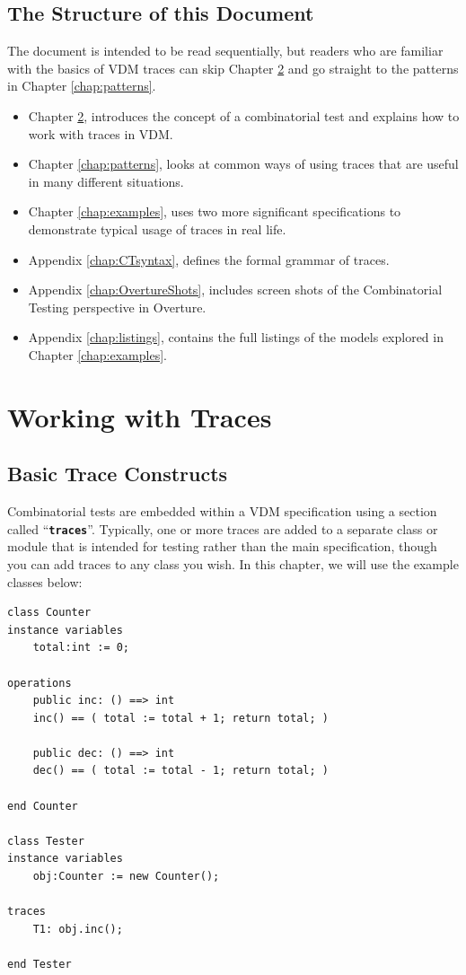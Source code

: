 \documentclass{overturerepchap}
\begin{document}
\section{The Structure of this Document}

The document is intended to be read sequentially, but readers who are familiar
with the basics of VDM traces can skip Chapter \ref{chap:traces} and go straight
to the patterns in Chapter \ref{chap:patterns}.

\begin{itemize}
\item Chapter \ref{chap:traces},  introduces the concept of
a combinatorial test and explains how to work with traces in VDM.
\item Chapter \ref{chap:patterns},  looks at common ways
of using traces that are useful in many different situations.
\item Chapter \ref{chap:examples},  uses two more
significant specifications to demonstrate typical usage of traces in real life.
\item Appendix \ref{chap:CTsyntax},  defines the formal
grammar of traces.
\item Appendix \ref{chap:OvertureShots},  includes
screen shots of the Combinatorial Testing perspective in Overture.
\item Appendix \ref{chap:listings},  contains the full
listings of the models explored in Chapter \ref{chap:examples}.
\end{itemize}

\chapter{Working with Traces}
\label{chap:traces}

\section{Basic Trace Constructs}
Combinatorial tests are embedded within a VDM specification using a section
called ``\texttt{\textbf{traces}}''. Typically, one or more traces are added to a separate class
or module that is intended for testing rather than the main specification,
though you can add traces to any class you wish. In this chapter, we will use
the example classes below:

\small
\begin{lstlisting}
class Counter
instance variables
    total:int := 0;

operations
    public inc: () ==> int
    inc() == ( total := total + 1; return total; )

    public dec: () ==> int
    dec() == ( total := total - 1; return total; )

end Counter

class Tester
instance variables
    obj:Counter := new Counter();

traces
    T1: obj.inc();

end Tester
\end{lstlisting}
\normalsize
\end{document}
